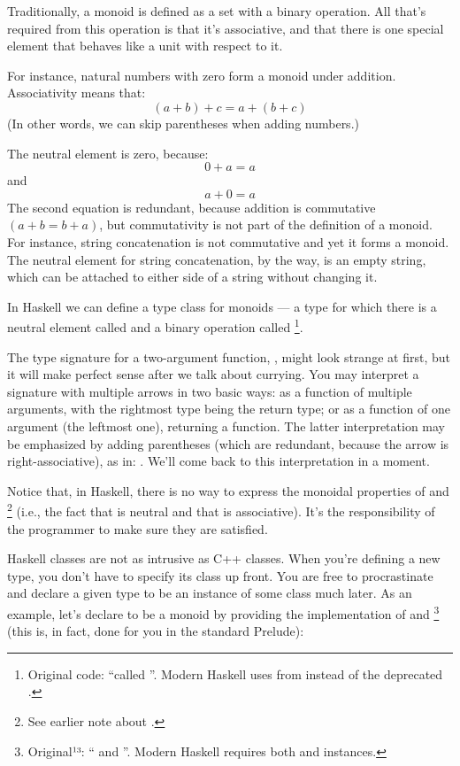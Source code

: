 Traditionally, a monoid is defined as a set with a binary operation. All
that's required from this operation is that it's associative, and that
there is one special element that behaves like a unit with respect to
it.

For instance, natural numbers with zero form a monoid under addition.
Associativity means that:
\[(a + b) + c = a + (b + c)\]
(In other words, we can skip parentheses when adding numbers.)

The neutral element is zero, because:
\[0 + a = a\]
and
\[a + 0 = a\]
The second equation is redundant, because addition is commutative $(a + b
  = b + a)$, but commutativity is not part of the definition of a monoid.
For instance, string concatenation is not commutative and yet it forms a
monoid. The neutral element for string concatenation, by the way, is an
empty string, which can be attached to either side of a string without
changing it.

In Haskell we can define a type class for monoids --- a type for which
there is a neutral element called  and a binary operation
called \code{(<>)}\footnote{Original code: ``called ''. Modern Haskell uses \code{(<>)} from  instead of the deprecated .}.

The type signature for a two-argument function,
, might look strange at first,
but it will make perfect sense after we talk about currying. You may
interpret a signature with multiple arrows in two basic ways: as a
function of multiple arguments, with the rightmost type being the return
type; or as a function of one argument (the leftmost one), returning a
function. The latter interpretation may be emphasized by adding
parentheses (which are redundant, because the arrow is
right-associative), as in: .
We'll come back to this interpretation in a moment.

Notice that, in Haskell, there is no way to express the monoidal
properties of  and \code{(<>)}\footnote{See earlier note about .} (i.e., the fact that
 is neutral and that \code{(<>)} is associative).
It's the responsibility of the programmer to make sure they are
satisfied.

Haskell classes are not as intrusive as C++ classes. When you're
defining a new type, you don't have to specify its class up front. You
are free to procrastinate and declare a given type to be an instance of
some class much later. As an example, let's declare  to
be a monoid by providing the implementation of  and
\code{(<>)}\footnote{Original¹³: `` and ''. Modern Haskell requires both  and  instances.} (this is, in fact, done for you in the standard
Prelude):

